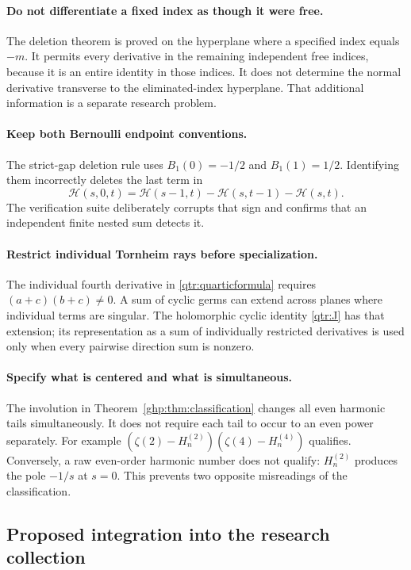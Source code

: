 \documentclass[11pt,a4paper]{article}
\numberwithin{equation}{section}
\theoremstyle{definition}
\theoremstyle{remark}
\begin{document}
\paragraph{Do not differentiate a fixed index as though it were free.}
The deletion theorem is proved on the hyperplane where a
specified index equals $-m$. It permits every derivative in
the remaining independent free indices, because it is an
entire identity in those indices. It does not determine the
normal derivative transverse to the eliminated-index
hyperplane. That additional information is a separate research
problem.

\paragraph{Keep both Bernoulli endpoint conventions.}
The strict-gap deletion rule uses $B_1(0)=-1/2$ and
$B_1(1)=1/2$. Identifying them incorrectly deletes the last
term in
\[
 \mathcal H(s,0,t)=\mathcal H(s-1,t)
                 -\mathcal H(s,t-1)-\mathcal H(s,t).
\]
The verification suite deliberately corrupts that sign and
confirms that an independent finite nested sum detects it.

\paragraph{Restrict individual Tornheim rays before specialization.}
The individual fourth derivative in \eqref{qtr:quarticformula}
requires $(a+c)(b+c)\ne0$. A sum of cyclic germs can extend
across planes where individual terms are singular. The
holomorphic cyclic identity \eqref{qtr:J} has that extension;
its representation as a sum of individually restricted
derivatives is used only when every pairwise direction sum
is nonzero.

\paragraph{Specify what is centered and what is simultaneous.}
The involution in Theorem~\ref{ghp:thm:classification} changes
all even harmonic tails simultaneously. It does not require
each tail to occur to an even power separately. For example
$(\zeta(2)-H_n^{(2)})(\zeta(4)-H_n^{(4)})$ qualifies.
Conversely, a raw even-order harmonic number does not qualify:
$H_n^{(2)}$ produces the pole $-1/s$ at $s=0$.
This prevents two opposite misreadings of the classification.

\subsection{Proposed integration into the research collection}
\end{document}

